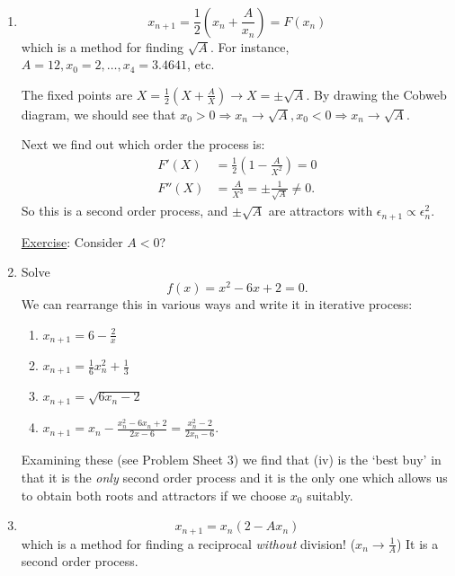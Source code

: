 \documentclass[12pt]{report}
\theoremstyle{definition}
\begin{document}
\begin{ex}
    \,

    \begin{enumerate}[label = (\alph*)]
        \item \[
                x_{n+1} = \frac{1}{2}\left(x_n + \frac{A}{x_n}\right) = F(x_n)
        \]
        which is a method for finding $\sqrt{A}$.
        For instance, $A=12, x_0 = 2, \ldots, x_4 = 3.4641$, etc.

        The fixed points are $X = \frac{1}{2}\left(X + \frac{A}{X}\right)
        \rightarrow{} X = \pm \sqrt{A}$. By drawing the Cobweb diagram, we should see that
        $x_0 > 0 \Rightarrow{} x_n \rightarrow{} \sqrt{A}, x_0 < 0 \Rightarrow{} x_n \rightarrow{} \sqrt{A}$.

        Next we find out which order the process is:\[
            \begin{align*}
                F'(X)  & = \frac{1}{2}\left(1 - \frac{A}{X^{2}}\right) = 0 \\
                F''(X) & = \frac{A}{X^{3}} = \pm \frac{1}{\sqrt{A}} \neq 0.
            \end{align*}
        \]
        So this is a second order process, and $\pm \sqrt{A}$ are attractors with
        $\epsilon_{n + 1} \propto \epsilon_{n}^{2}$.

        \underline{Exercise}: Consider $A < 0$?

    \item Solve\[
            f(x) = x^{2} - 6x + 2 = 0.
    \]
    We can rearrange this in various ways and write it in iterative process:
    \begin{enumerate}[label = (\roman*)]
        \item $x_{n + 1} = 6 - \frac{2}{x}$
        \item $x_{n + 1} = \frac{1}{6}x_n^{2} + \frac{1}{3}$
        \item $x_{n + 1} = \sqrt{6x_n - 2}$
        \item $x_{n + 1} = x_n - \frac{x_n^{2} - 6x_n + 2}{2x - 6}
            = \frac{x_n^{2} - 2}{2x_n - 6}$.
    \end{enumerate}

    Examining these (see Problem Sheet 3) we find that (iv) is the `best buy'
    in that it is the \emph{only} second order process and it is the only one
    which allows us to obtain both roots and attractors if we choose $x_0$ suitably.

\item \[
        x_{n + 1} = x_n (2 - Ax_n)
\]
which is a method for finding a reciprocal \emph{without} division! ($x_n \rightarrow{} \frac{1}{A}$)
It is a second order process.


\end{enumerate}
\end{ex}
\end{document}
